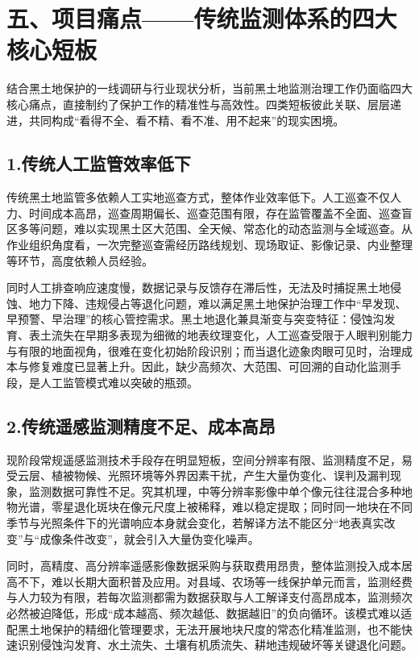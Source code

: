 \section{五、项目痛点——传统监测体系的四大核心短板}

结合黑土地保护的一线调研与行业现状分析，当前黑土地监测治理工作仍面临四大核心痛点，直接制约了保护工作的精准性与高效性。四类短板彼此关联、层层递进，共同构成“看得不全、看不精、看不准、用不起来”的现实困境。

\subsection{1.传统人工监管效率低下}

传统黑土地监管多依赖人工实地巡查方式，整体作业效率低下。人工巡查不仅人力、时间成本高昂，巡查周期偏长、巡查范围有限，存在监管覆盖不全面、巡查盲区多等问题，难以实现黑土区大范围、全天候、常态化的动态监测与全域巡查。从作业组织角度看，一次完整巡查需经历路线规划、现场取证、影像记录、内业整理等环节，高度依赖人员经验。

同时人工排查响应速度慢，数据记录与反馈存在滞后性，无法及时捕捉黑土地侵蚀、地力下降、违规侵占等退化问题，难以满足黑土地保护治理工作中“早发现、早预警、早治理”的核心管控需求。黑土地退化兼具渐变与突变特征：侵蚀沟发育、表土流失在早期多表现为细微的地表纹理变化，人工巡查受限于人眼判别能力与有限的地面视角，很难在变化初始阶段识别；而当退化迹象肉眼可见时，治理成本与修复难度已显著上升。因此，缺少高频次、大范围、可回溯的自动化监测手段，是人工监管模式难以突破的瓶颈。

\subsection{2.传统遥感监测精度不足、成本高昂}

现阶段常规遥感监测技术手段存在明显短板，空间分辨率有限、监测精度不足，易受云层、植被物候、光照环境等外界因素干扰，产生大量伪变化、误判及漏判现象，监测数据可靠性不足。究其机理，中等分辨率影像中单个像元往往混合多种地物光谱，零星退化斑块在像元尺度上被稀释，难以稳定提取；同时同一地块在不同季节与光照条件下的光谱响应本身就会变化，若解译方法不能区分“地表真实改变”与“成像条件改变”，就会引入大量伪变化噪声。

同时，高精度、高分辨率遥感影像数据采购与获取费用昂贵，整体监测投入成本居高不下，难以长期大面积普及应用。对县域、农场等一线保护单元而言，监测经费与人力较为有限，若每次监测都需为数据获取与人工解译支付高昂成本，监测频次必然被迫降低，形成“成本越高、频次越低、数据越旧”的负向循环。该模式难以适配黑土地保护的精细化管理要求，无法开展地块尺度的常态化精准监测，也不能快速识别侵蚀沟发育、水土流失、土壤有机质流失、耕地违规破坏等关键退化问题。


